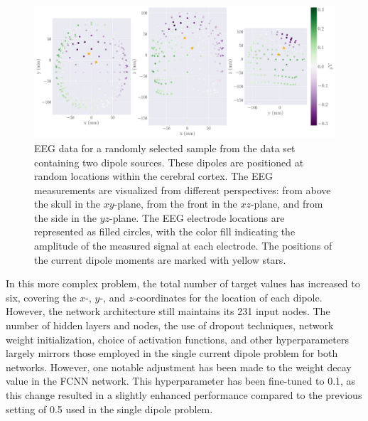 \documentclass[a4paper, UKenglish, 11pt]{uiomaster}
\begin{document}
\begin{figure}[!htb]
\centering
\hspace*{-2.5cm}
\includegraphics[width=18cm]{figures/purple_green/dipoles_w_amplitudes_eeg_field_2_20.pdf}
\caption{EEG data for a randomly selected sample from the data set containing two dipole sources. These dipoles are positioned at random locations within the cerebral cortex. The EEG measurements are visualized from different perspectives: from above the skull in the $xy$-plane, from the front in the $xz$-plane, and from the side in the $yz$-plane. The EEG electrode locations are represented as filled circles, with the color fill indicating the amplitude of the measured signal at each electrode. The positions of the current dipole moments are marked with yellow stars.}
\label{fig:multiple_dipoles_data}
\end{figure}

\FloatBarrier

In this more complex problem, the total number of target values has increased to six, covering the $x$-, $y$-, and $z$-coordinates for the location of each dipole. However, the network architecture still maintains its 231 input nodes. The number of hidden layers and nodes, the use of dropout techniques, network weight initialization, choice of activation functions, and other hyperparameters largely mirrors those employed in the single current dipole problem for both networks. However, one notable adjustment has been made to the weight decay value in the FCNN network. This hyperparameter has been fine-tuned to 0.1, as this change resulted in a slightly enhanced performance compared to the previous setting of 0.5 used in the single dipole problem.
\end{document}
